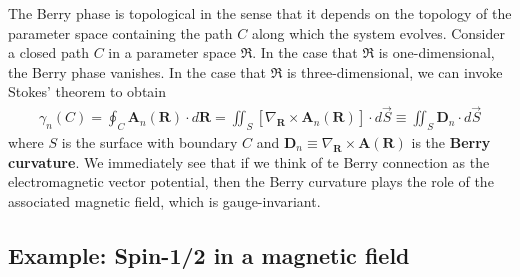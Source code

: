 \documentclass{article}
\theoremstyle{definition}
\newcommand{\lb}{\left[}
\newcommand{\rb}{\right]}
\begin{document}
The Berry phase is topological in the sense that it depends on the topology of the parameter space containing the path $C$ along which the system evolves. Consider a closed path $C$ in a parameter space $\mathfrak{R}$. In the case that $\mathfrak{R}$ is one-dimensional, the Berry phase vanishes. In the case that $\mathfrak{R}$ is three-dimensional, we can invoke Stokes' theorem to obtain 
\begin{align*}
\gamma_n(C) =  \oint_C \bm{A}_n(\bm{R}) \cdot d{\bm{R}} = \iint_{S} \lb  \nabla_{\bm{R}} \times \bm{A}_n(\bm{R}) \rb  \cdot d\vec{S} \equiv \iint_S \bm{D}_n \cdot d\vec{S}
\end{align*}
where $S$ is the surface with boundary $C$ and $\bm{D}_n \equiv \nabla_{\bm{R}} \times \bm{A}(\bm{R}) $ is the \textbf{Berry curvature}. We immediately see that if we think of te Berry connection as the electromagnetic vector potential, then the Berry curvature plays the role of the associated magnetic field, which is gauge-invariant. 






\subsection{Example: Spin-1/2 in a magnetic field}
\end{document}
